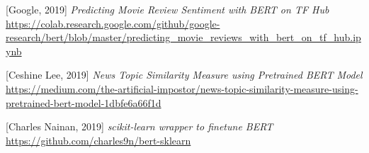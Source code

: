 \documentclass[10pt, a4paper, twocolumn]{article}
\begin{document}
\begin{thebibliography}{1}
 [Google, 2019] {\em Predicting Movie Review Sentiment with BERT on TF Hub} \url{https://colab.research.google.com/github/google-research/bert/blob/master/predicting_movie_reviews_with_bert_on_tf_hub.ipynb}

 [Ceshine Lee, 2019] {\em News Topic Similarity Measure using Pretrained BERT Model} \url{https://medium.com/the-artificial-impostor/news-topic-similarity-measure-using-pretrained-bert-model-1dbfe6a66f1d}

 [Charles Nainan, 2019] {\em scikit-learn wrapper to finetune BERT} \url{https://github.com/charles9n/bert-sklearn}

\end{thebibliography}
\end{document}
